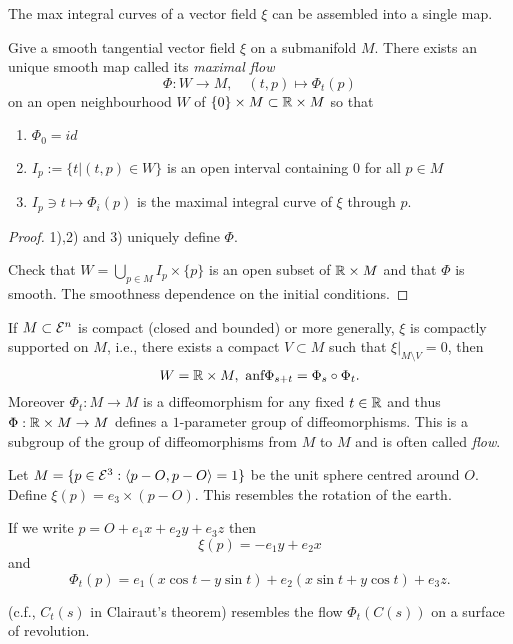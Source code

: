 The max integral curves of a vector field $\xi$ can be assembled into a single map.

\begin{theorem, definition}
	Give a smooth tangential vector field $\xi$ on a submanifold $M$. There exists an unique smooth map called its \emph{maximal flow}
		\[ \Phi : W \to M, \quad (t,p) \mapsto \Phi_t(p) \]
	on an open neighbourhood $W$ of $\{0\}\times M \subset \mathbb R\times M$ so that 
	\begin{enumerate}
		\item $\Phi_0=id$
		\item $I_p:= \{ t| (t,p) \in W \}$ is an open interval containing $0$ for all $p \in M$
		\item $I_p \ni t \mapsto \Phi_i (p)$ is the maximal integral curve of $\xi$ through $p$.
	\end{enumerate}
\end{theorem, definition}

\begin{proof}
	1),2) and 3) uniquely define $\Phi$.
	
	Check that $W=\bigcup_{p \in M } I_p \times \{p\}$ is an open subset of $\mathbb R \times M$ and  that $\Phi$ is smooth. The smoothness dependence on the initial conditions. 
\end{proof}

\begin{remark, definition}
	If $M \subset \mathcal E^n$ is compact (closed and bounded) or more generally, $\xi$ is compactly supported on $M$, i.e., there exists a compact $V \subset M$ such that $\xi |_{M \setminus V}=0$, then
		\[ W=\mathbb R \times M, \text{ anf} \Phi_{s+t} = \Phi_s \circ \Phi_t. \]
	Moreover $\Phi_t : M \to M$ is a diffeomorphism for any fixed $t \in \mathbb R$ and thus $\Phi: \mathbb R \times M \to M$ defines a $1$-parameter group of diffeomorphisms. This is a subgroup of the group of diffeomorphisms from $M$ to $M$ and is often called \emph{flow}.
\end{remark, definition}

\begin{example}
	Let $M = \{ p \in \mathcal E^3 : \left \langle p-O,p-O \right\rangle =1 \}$ be the unit sphere centred around $O$. Define $\xi(p)= e_3 \times (p-O)$. This resembles the rotation of the earth.
	
	If we write $p=O+ e_1x+e_2y+e_3z$ then 
		\[ \xi(p)=-e_1y + e_2x \]
	and 
		\[ \Phi_t(p)=e_1(x\cos t -y\sin t) + e_2 (x \sin t + y \cos t) + e_3z. \]
\end{example}

\begin{remark}
	(c.f., $C_t(s)$ in Clairaut's theorem) resembles the flow $\Phi_t(C(s))$ on a surface of revolution.
\end{remark}

